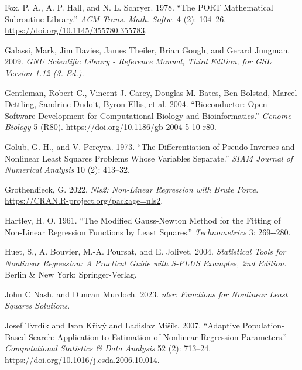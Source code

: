 \begin{CSLReferences}{1}{0}
\leavevmode{}%
Fox, P. A., A. P. Hall, and N. L. Schryer. 1978. {``The PORT Mathematical Subroutine Library.''} \emph{ACM Trans. Math. Softw.} 4 (2): 104--26. \url{https://doi.org/10.1145/355780.355783}.

\leavevmode{}%
Galassi, Mark, Jim Davies, James Theiler, Brian Gough, and Gerard Jungman. 2009. \emph{GNU Scientific Library - Reference Manual, Third Edition, for GSL Version 1.12 (3. Ed.).}

\leavevmode{}%
Gentleman, Robert C., Vincent J. Carey, Douglas M. Bates, Ben Bolstad, Marcel Dettling, Sandrine Dudoit, Byron Ellis, et al. 2004. {``Bioconductor: Open Software Development for Computational Biology and Bioinformatics.''} \emph{{Genome Biology}} 5 (R80). \url{https://doi.org/10.1186/gb-2004-5-10-r80}.

\leavevmode{}%
Golub, G. H., and V. Pereyra. 1973. {``The Differentiation of Pseudo-Inverses and Nonlinear Least Squares Problems Whose Variables Separate.''} \emph{SIAM Journal of Numerical Analysis} 10 (2): 413--32.

\leavevmode{}%
Grothendieck, G. 2022. \emph{Nls2: Non-Linear Regression with Brute Force}. \url{https://CRAN.R-project.org/package=nls2}.

\leavevmode{}%
Hartley, H. O. 1961. {``The Modified Gauss-Newton Method for the Fitting of Non-Linear Regression Functions by Least Squares.''} \emph{Technometrics} 3: 269-\/-280.

\leavevmode{}%
Huet, S., A. Bouvier, M.-A. Poursat, and E. Jolivet. 2004. \emph{Statistical Tools for Nonlinear Regression: A Practical Guide with {S-PLUS} Examples, 2nd Edition}. Berlin \& New York: Springer-Verlag.

\leavevmode{}%
John C Nash, and Duncan Murdoch. 2023. \emph{{nlsr: Functions for Nonlinear Least Squares Solutions}}.

\leavevmode{}%
Josef Tvrdík and Ivan Křivý and Ladislav Mišík. 2007. {``Adaptive Population-Based Search: Application to Estimation of Nonlinear Regression Parameters.''} \emph{{Computational Statistics \& Data Analysis}} 52 (2): 713--24. \url{https://doi.org/10.1016/j.csda.2006.10.014}.


\end{CSLReferences}
